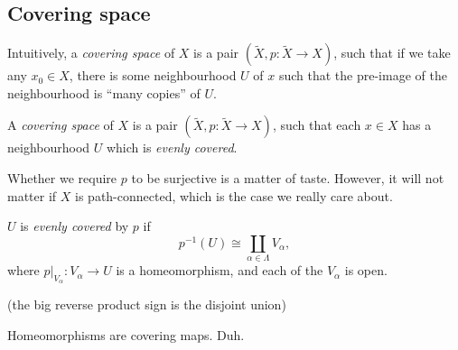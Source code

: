 \documentclass[a4paper]{article}
\begin{document}
\subsection{Covering space}
Intuitively, a \emph{covering space} of $X$ is a pair $(\tilde{X}, p: \tilde{X} \to X)$, such that if we take any $x_0 \in X$, there is some neighbourhood $U$ of $x$ such that the pre-image of the neighbourhood is ``many copies'' of $U$.
\begin{center}
\end{center}

\begin{defi}
  A \emph{covering space} of $X$ is a pair $(\tilde{X}, p: \tilde{X} \to X)$, such that each $x\in X$ has a neighbourhood $U$ which is \emph{evenly covered}.
\end{defi}
Whether we require $p$ to be surjective is a matter of taste. However, it will not matter if $X$ is path-connected, which is the case we really care about.

\begin{defi}
  $U$ is \emph{evenly covered} by $p$ if
  \[
    p^{-1}(U) \cong \coprod_{\alpha \in \Lambda}V_\alpha,
  \]
  where $p|_{V_\alpha}: V_\alpha \to U$ is a homeomorphism, and each of the $V_\alpha$ is open.

  (the big reverse product sign is the disjoint union)
\end{defi}

\begin{eg}
  Homeomorphisms are covering maps. Duh.
\end{eg}
\end{document}
